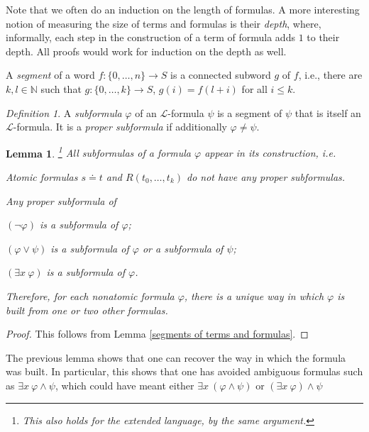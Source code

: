 \documentclass[a4paper, 11pt]{amsart}
\newtheorem{lemma}[lemma]{Lemma}
\theoremstyle{remark}
\newtheorem{definition}[definition]{Definition}
\newcommand{\NN}{\mathbb{N}}
\newcommand{\cL}{\mathcal L}
\newenvironment{enumerate-(a)}{\begin{enumerate}[label={\upshape (\alph*)}, leftmargin=2pc]}{\end{enumerate}}
\newenvironment{enumerate-(1)}{\begin{enumerate}[label={\upshape (\arabic*)}, leftmargin=2pc]}{\end{enumerate}}
\begin{document}

Note that we often do an induction on the length of formulas. A more interesting notion of measuring the size of terms and formulas is their \emph{depth}, where, informally, each step in the construction of a term of formula adds $1$ to their depth. 
All proofs would work for induction on the depth as well. 


A \emph{segment} of a word $f\colon \{0,\dots,n\}\rightarrow S$ is a connected subword $g$ of $f$, i.e., there are $k,l\in \NN$ such that $g\colon \{0,\dots,k\}\rightarrow S$, $g(i)=f(l+i)$ for all $i\leq k$. 

\begin{definition} 
A \emph{subformula} $\varphi$ of an $\cL$-formula $\psi$ is a segment of $\psi$ that is itself an $\cL$-formula. 
It is a \emph{proper subformula} if additionally $\varphi\neq \psi$. 
\end{definition}

\begin{lemma} 
\label{appearance of subformulas}\footnote{This also holds for the extended language, by the same argument. } 
All subformulas of a formula $\varphi$ appear in its construction, i.e. 
\begin{enumerate-(1)} 
\item 
Atomic formulas $s\doteq t$ and $R(t_0,\dots,t_k)$ do not have any proper subformulas. 
\item 
Any proper subformula of 
\begin{enumerate-(a)} 
\item 
$(\neg\varphi)$ is a subformula of $\varphi$; 
\item 
$(\varphi \vee \psi)$ is a subformula of $\varphi$ or a subformula of $\psi$; 
\item 
$(\exists x\ \varphi)$ is a subformula of $\varphi$. 
\end{enumerate-(a)} 
\end{enumerate-(1)} 
Therefore, for each nonatomic formula $\varphi$, there is a unique way in which $\varphi$ is built from one or two other formulas. 
\end{lemma} 
\begin{proof}
This follows from Lemma \ref{segments of terms and formulas}. 
\end{proof} 

The previous lemma shows that one can recover the way in which the formula was built. 
In particular, this shows that one has avoided ambiguous formulas such as $\exists x\ \varphi\wedge \psi$, which could have meant either $\exists x\ (\varphi\wedge \psi)$ or $(\exists x\ \varphi) \wedge \psi$
\end{document}
